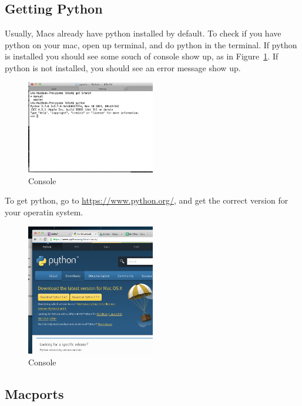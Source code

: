 \documentclass[letterpaper,10pt]{article}
\begin{document}
\subsection{Getting Python}

Usually, Macs already have python installed by default. To check if you have python on your mac,
open up terminal, and do python in the terminal. If python is installed you should see some souch of console show up, as in Figure~\ref{fig:python_console}. If python is not installed, you should see an error message show up. 

\begin{figure}[h!]
  \centering
  \includegraphics[width=0.5\textwidth]{images/python_console}
  \caption{Console}
  \label{fig:python_console}
\end{figure}

To get python, go to \url{https://www.python.org/}, and get the correct version for your operatin system. 

\begin{figure}[h!]
  \centering
  \includegraphics[width=0.5\textwidth]{images/python_version}
  \caption{Console}
  \label{fig:python_version}
\end{figure}

\subsection{Macports}
\end{document}
